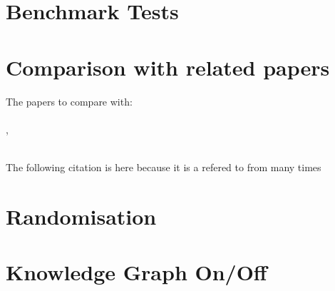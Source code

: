 \newpage
\section{Benchmark Tests}
\section{Comparison with related papers}
The papers to compare with:\\

\\

\cite{sabbagh_novin_model_2021}, 


\\
\cite{novin_dynamic_2018}
The following \cite{novin_dynamic_2018} citation is here because it is a refered to from \cite{sabbagh_novin_model_2021} many times
\section{Randomisation}
\section{Knowledge Graph On/Off}